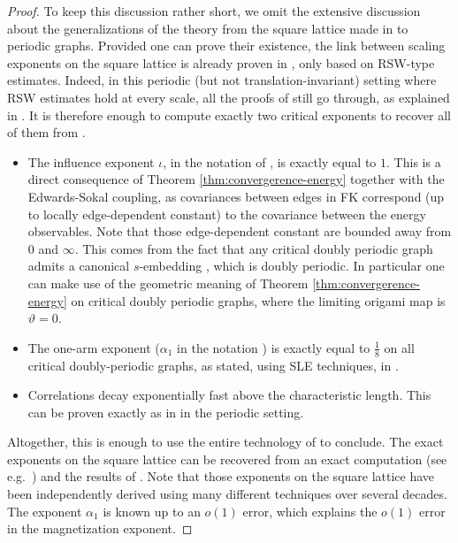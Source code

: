 \documentclass[reqno]{amsart}
\numberwithin{equation}{section}
\theoremstyle{definition}
\theoremstyle{remark}
\begin{document}
\begin{proof}
To keep this discussion rather short, we omit the extensive discussion about the generalizations of the theory from the square lattice made in \cite{FK_scaling_relations} to periodic graphs. Provided one can prove their existence, the link between scaling exponents on the square lattice is already proven in \cite[Theorem 1.11]{FK_scaling_relations}, only based on RSW-type estimates. Indeed, in this periodic (but not translation-invariant) setting where RSW estimates hold at every scale, all the proofs of \cite{FK_scaling_relations} still go through, as explained in \cite[Section 2.2]{AveMah25}. It is therefore enough to compute exactly two critical exponents to recover all of them from \cite{FK_scaling_relations}.
\begin{itemize}
\item The influence exponent $\iota$, in the notation of \cite[(R1-R7)]{FK_scaling_relations}, is exactly equal to $1$. This is a direct consequence of Theorem \ref{thm:convergerence-energy} together with the Edwards-Sokal coupling, as covariances between edges in FK correspond (up to locally edge-dependent constant) to the covariance between the energy observables. Note that those edge-dependent constant are bounded away from $0$ and $\infty$. This comes from the fact that any critical doubly periodic graph admits a canonical $s$-embedding \cite[Lemma 2.3]{Che20}, which is doubly periodic. In particular one can make use of the geometric meaning of Theorem \ref{thm:convergerence-energy} on critical doubly periodic graphs, where the limiting origami map is $\vartheta =0 $.
\item The one-arm exponent ($\alpha_1$ in the notation \cite{FK_scaling_relations}) is exactly equal to $\frac{1}{8}$ on all critical doubly-periodic graphs, as stated, using SLE techniques, in \cite{Mah25b}.
\item Correlations decay exponentially fast above the characteristic length. This can be proven exactly as in \cite[Section 2.4]{FK_scaling_relations} in the periodic setting.
\end{itemize}
Altogether, this is enough to use the entire technology of \cite{FK_scaling_relations} to conclude. The exact exponents on the square lattice can be recovered from an exact computation (see e.g.\ \cite{McWu-Ising}) and the results of \cite{FK_scaling_relations}. Note that those exponents on the square lattice have been independently derived using many different techniques over several decades. The exponent $\alpha_1$ is known up to an $o(1)$ error, which explains the $o(1)$ error in the magnetization exponent.
\end{proof}
\end{document}
